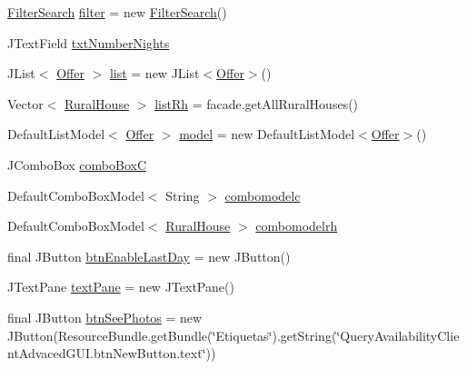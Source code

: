 \begin{DoxyCompactItemize}
\item 
\mbox{\hyperlink{classbusiness_logic_1_1_filter_search}{Filter\+Search}} \mbox{\hyperlink{classgui_1_1_query_availability_client_advaced_g_u_i_ade24d71c6b249058663f4b199c29a317}{filter}} = new \mbox{\hyperlink{classbusiness_logic_1_1_filter_search}{Filter\+Search}}()
\item 
J\+Text\+Field \mbox{\hyperlink{classgui_1_1_query_availability_client_advaced_g_u_i_a166fd224a2434ae9bfdda92583163825}{txt\+Number\+Nights}}
\item 
J\+List$<$ \mbox{\hyperlink{classdomain_1_1_offer}{Offer}} $>$ \mbox{\hyperlink{classgui_1_1_query_availability_client_advaced_g_u_i_a1b0029e151744408698185103431652e}{list}} = new J\+List$<$\mbox{\hyperlink{classdomain_1_1_offer}{Offer}}$>$()
\item 
Vector$<$ \mbox{\hyperlink{classdomain_1_1_rural_house}{Rural\+House}} $>$ \mbox{\hyperlink{classgui_1_1_query_availability_client_advaced_g_u_i_ad7253f53e611e8e9eb49d69eda34c3dc}{list\+Rh}} = facade.\+get\+All\+Rural\+Houses()
\item 
Default\+List\+Model$<$ \mbox{\hyperlink{classdomain_1_1_offer}{Offer}} $>$ \mbox{\hyperlink{classgui_1_1_query_availability_client_advaced_g_u_i_a4f921e1a8cb3a5ebf9c3093cc8344932}{model}} = new Default\+List\+Model$<$\mbox{\hyperlink{classdomain_1_1_offer}{Offer}}$>$()
\item 
J\+Combo\+Box \mbox{\hyperlink{classgui_1_1_query_availability_client_advaced_g_u_i_a65f09bcf200b7c759a0aba2c6d111f50}{combo\+BoxC}}
\item 
Default\+Combo\+Box\+Model$<$ String $>$ \mbox{\hyperlink{classgui_1_1_query_availability_client_advaced_g_u_i_af2ed92b442f0e62618b199a892755429}{combomodelc}}
\item 
Default\+Combo\+Box\+Model$<$ \mbox{\hyperlink{classdomain_1_1_rural_house}{Rural\+House}} $>$ \mbox{\hyperlink{classgui_1_1_query_availability_client_advaced_g_u_i_af9fbcdbb24f0e8c6bd10078eb1c90527}{combomodelrh}}
\item 
final J\+Button \mbox{\hyperlink{classgui_1_1_query_availability_client_advaced_g_u_i_ac84a7f02ee36671fdcf19c79cef949ef}{btn\+Enable\+Last\+Day}} = new J\+Button()
\item 
J\+Text\+Pane \mbox{\hyperlink{classgui_1_1_query_availability_client_advaced_g_u_i_a69be3a2280f523fa654142a373a5779c}{text\+Pane}} = new J\+Text\+Pane()
\item 
final J\+Button \mbox{\hyperlink{classgui_1_1_query_availability_client_advaced_g_u_i_af3e49155b72ba70bc43512f634a4228f}{btn\+See\+Photos}} = new J\+Button(Resource\+Bundle.\+get\+Bundle(\char`\"{}Etiquetas\char`\"{}).get\+String(\char`\"{}Query\+Availability\+Client\+Advaced\+G\+U\+I.\+btn\+New\+Button.\+text\char`\"{}))

\end{DoxyCompactItemize}
